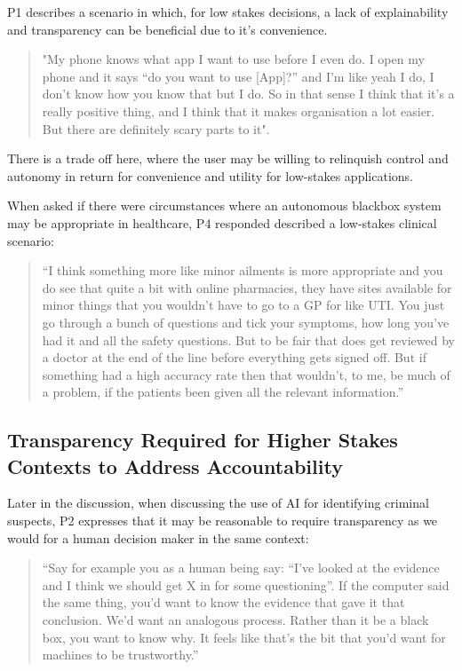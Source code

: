 \documentclass[manuscript,screen,review]{acmart}
\begin{document}
P1 describes a scenario in which, for low stakes decisions, a lack of explainability and transparency can be beneficial due to it’s convenience. 

\begin{quote}
"My phone knows what app I want to use before I even do. I open my phone and it says “do you want to use [App]?” and I'm like yeah I do, I don’t know how you know that but I do. So in that sense I think that it’s a really positive thing, and I think that it makes organisation a lot easier. But there are definitely scary parts to it". 
\end{quote}

There is a trade off here, where the user may be willing to relinquish control and autonomy in return for convenience and utility for low-stakes applications. 

When asked if there were circumstances where an autonomous blackbox system may be appropriate in healthcare, P4 responded described a low-stakes clinical scenario:

\begin{quote}
“I think something more like minor ailments is more appropriate and you do see that quite a bit with online pharmacies, they have sites available for minor things that you wouldn’t have to go to a GP for like UTI. You just go through a bunch of questions and tick your symptoms, how long you’ve had it and all the safety questions. But to be fair that does get reviewed by a doctor at the end of the line before everything gets signed off. But if something had a high accuracy rate then that wouldn’t, to me, be much of a problem, if the patients been given all the relevant information.”
\end{quote}

\subsection{Transparency Required for Higher Stakes Contexts to Address Accountability}

Later in the discussion, when discussing the use of AI for identifying criminal suspects, P2 expresses that it may be reasonable to require transparency as we would for a human decision maker in the same context:  

\begin{quote}
“Say for example you as a human being say: “I've looked at the evidence and I think we should get X in for some questioning”. If the computer said the same thing, you'd want to know the evidence that gave it that conclusion. We'd want an analogous process. Rather than it be a black box, you want to know why. It feels like that’s the bit that you'd want for machines to be trustworthy.”
\end{quote}
\end{document}
